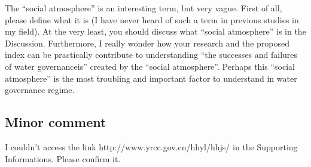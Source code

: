 \RC{} The ``social atmosphere'' is an interesting term, but very vague. First of all, please define what it is (I have never heard of such a term in previous studies in my field). At the very least, you should discuss what ``social atmosphere'' is in the Discussion. Furthermore, I really wonder how your research and the proposed index can be practically contribute to understanding ``the successes and failures of water governanceis'' created by the ``social atmosphere''. Perhaps this ``social atmosphere'' is the most troubling and important factor to understand in water governance regime.

\subsection*{Minor comment}

\RC{} I couldn't access the link http://www.yrcc.gov.cn/hhyl/hhjs/ in the Supporting Informations. Please confirm it.
